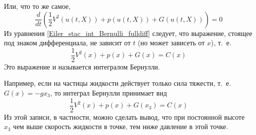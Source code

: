 Или, что то же самое,
\begin{equation*} \label{Eiler_stac_int_Bernulli_fulldiff}
	\frac{d}{dt}\left(\frac{1}{2} V^2(u(t,X)) + p(u(t,X)) + G (u(t,X))\right) = 0
\end{equation*}
Из уравнения \eqref{Eiler_stac_int_Bernulli_fulldiff} следует, что выражение,
стоящее под знаком дифференциала, не зависит от $t$ (но может зависеть от $x$), т.~е.
\begin{equation*} %
	\frac{1}{2} V^2(x) + p(x) + G (x) = C(x)
\end{equation*}
Это выражение и называется интегралом Бернулли.

Например, если на частицы жидкости действует только сила тяжести,
т.~е. $G(x) = -gx_3$, то интеграл Бернулли принимает вид
\begin{equation*} %
	\frac{1}{2} V^2(x) + p(x) + G (x_3) = C(x)
\end{equation*}
Из этой записи, в частности, можно сделать вывод,
что при постоянной высоте $x_3$ чем выше скорость жидкости в точке,
тем ниже давление в этой точке.
